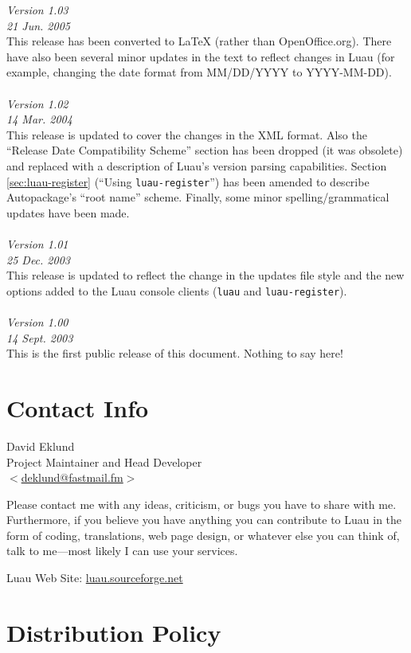 \documentclass{report}
\begin{document}
\emph{Version 1.03}\\
\emph{21 Jun. 2005}\\
This release has been converted to \LaTeX{} (rather than OpenOffice.org).  There have also been several minor updates in the text to reflect changes in Luau (for example, changing the date format from MM/DD/YYYY to YYYY-MM-DD).
\\ \\
\emph{Version 1.02}\\
\emph{14 Mar. 2004}\\
This release is updated to cover the changes in the XML format.  Also the ``Release Date Compatibility Scheme'' section has been dropped (it was obsolete) and replaced with a description of Luau's version parsing capabilities.  Section \ref{sec:luau-register} (``Using \verb+luau-register+'') has been amended to describe Autopackage's ``root name'' scheme.  Finally, some minor spelling/grammatical updates have been made.
\\ \\
\emph{Version 1.01}\\
\emph{25 Dec. 2003}\\
This release is updated to reflect the change in the updates file style and the new options added to the Luau console clients (\verb+luau+ and \verb+luau-register+).
\\ \\
\emph{Version 1.00}\\
\emph{14 Sept. 2003}\\
This is the first public release of this document.  Nothing to say here!

\section{Contact Info}

David Eklund\\
Project Maintainer and Head Developer\\
\href{mailto:deklund@fastmail.fm}{$<$deklund@fastmail.fm$>$}

Please contact me with any ideas, criticism, or bugs you have to share with me.  Furthermore, if you believe you have anything you can contribute to Luau in the form of coding, translations, web page design, or whatever else you can think of, talk to me---most likely I can use your services.

Luau Web Site: \href{http://luau.sourceforge.net}{luau.sourceforge.net}

\section{Distribution Policy}
\end{document}
